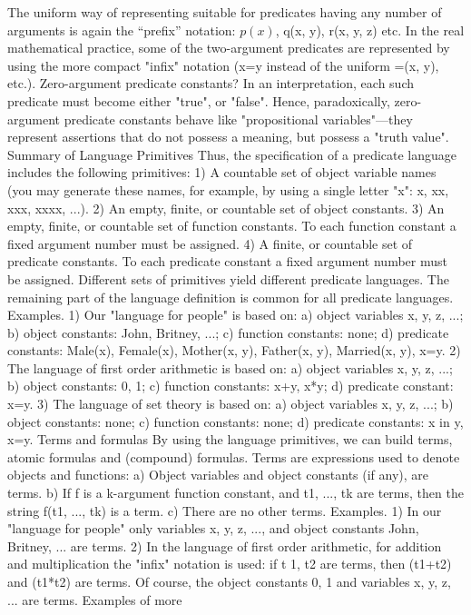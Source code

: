 The uniform way of representing suitable for predicates having any number of arguments is again the
``prefix'' notation: \(p(x)\), q(x, y), r(x, y, z) etc. In the real mathematical practice, some of the two-argument
predicates are represented by using the more compact "infix" notation (x=y instead of the uniform =(x, y),
etc.).
Zero-argument predicate constants? In an interpretation, each such predicate must become either "true", or "false". Hence,
paradoxically, zero-argument predicate constants behave like "propositional variables"---they represent assertions that do not
possess a meaning, but possess a "truth value".
Summary of Language Primitives
Thus, the specification of a predicate language includes the following primitives:
1) A countable set of object variable names (you may generate these names, for example, by using a
single letter "x": x, xx, xxx, xxxx, ...).
2) An empty, finite, or countable set of object constants.
3) An empty, finite, or countable set of function constants. To each function constant a fixed argument
number must be assigned.
4) A finite, or countable set of predicate constants. To each predicate constant a fixed argument number
must be assigned.
Different sets of primitives yield different predicate languages. The remaining part of the language
definition is common for all predicate languages.
Examples. 1) Our "language for people" is based on: a) object variables x, y, z, ...; b) object constants: John, Britney, ...; c)
function constants: none; d) predicate constants: Male(x), Female(x), Mother(x, y), Father(x, y), Married(x, y), x=y.
2) The language of first order arithmetic is based on: a) object variables x, y, z, ...; b) object constants: 0, 1; c) function
constants: x+y, x*y; d) predicate constant: x=y.
3) The language of set theory is based on: a) object variables x, y, z, ...; b) object constants: none; c) function constants: none;
d) predicate constants: x in y, x=y.
Terms and formulas
By using the language primitives, we can build terms, atomic formulas and (compound) formulas.
Terms are expressions used to denote objects and functions:
a) Object variables and object constants (if any), are terms.
b) If f is a k-argument function constant, and t1, ..., tk are terms, then the string f(t1, ..., tk) is a term.
c) There are no other terms.
Examples. 1) In our "language for people" only variables x, y, z, ..., and object constants John, Britney, ... are terms.
2) In the language of first order arithmetic, for addition and multiplication the "infix" notation is used: if t 1, t2 are terms, then
(t1+t2) and (t1*t2) are terms. Of course, the object constants 0, 1 and variables x, y, z, ... are terms. Examples of more
